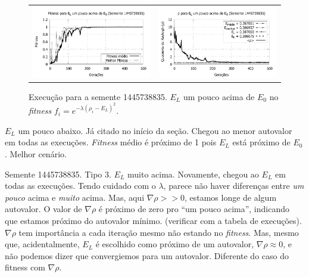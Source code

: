 	\begin{figure}[htbp]
	\centering
  \begin{tabular}{@{}cc@{}}
	
		\includegraphics[width=.45\textwidth]{figs/resultados/variandoELSemente/T1_S-1445738835_fitness.pdf} &
    \includegraphics[width=.45\textwidth]{figs/resultados/variandoELSemente/T1_S-1445738835_rho.pdf}
  \end{tabular}
  \caption{Execução para a semente 1445738835. $E_L$ um pouco acima de $E_0$ no \textit{fitness} $f_i = e^{-\lambda(\rho_i - E_L)^2}$.}
	\label{fig:execucoesSemente_EL_umPoucoAcima}
	\end{figure}
	
	$E_L$ um pouco abaixo. Já citado no início da seção. Chegou ao menor autovalor em todas as execuções. \emph{Fitness} médio é próximo de 1 pois $E_L$ está próximo de $E_0$. Melhor cenário.
	
	Semente 1445738835. Tipo 3. $E_L$ muito acima. Novamente, chegou ao $E_L$ em todas as execuções. Tendo cuidado com o $\lambda$, parece não haver diferenças entre \emph{um pouco} acima e \emph{muito} acima. Mas, aqui $\nabla\rho >> 0 $, estamos longe de algum autovalor. O valor de $\nabla\rho$ é próximo de zero pro ``um pouco acima'', indicando que estamos próximo do autovalor mínimo. (verificar com a tabela de execuções). $\nabla\rho$ tem importância a cada iteração mesmo não estando no \emph{fitness}. Mas, mesmo que, acidentalmente, $E_L$ é escolhido como próximo de um autovalor, $\nabla\rho \approx 0$, e não podemos dizer que convergiemos para um autovalor. Diferente do caso do fitness com $\nabla\rho$.
	
